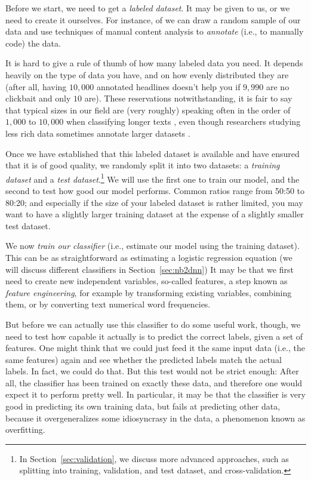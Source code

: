 Before we start, we need to get a \emph{labeled dataset}.
It may be given to us, or we need to create it ourselves.
For instance, of we can draw a random sample of our data and use techniques
of manual content analysis \citep[e.g.,][]{riffe2019analyzing} to
\emph{annotate} (i.e., to manually code) the data.

It is hard to give a rule of thumb of how many labeled data you need.
It depends heavily on the type of data you have, and on how evenly distributed
they are (after all, having $10,000$ annotated headlines doesn't help you if
$9,990$ are no clickbait and only $10$ are).
These reservations notwithstanding, it is fair to say that typical sizes in
our field are (very roughly) speaking often in the order of $1,000$ to $10,000$
when classifying longer texts \citep[see, for instance,][]{burscher2014teaching},
even though researchers studying less rich data sometimes annotate larger
datasets \citep[e.g., $60,000$ social media messages in][]{vermeer2019seeing}.

Once we have established that this labeled dataset is available and have
ensured that it is of good quality, we randomly split it into two datasets:
a \emph{training dataset} and a \emph{test dataset}.\footnote{In
  Section~\ref{sec:validation}, we discuss more advanced approaches, such
  as splitting into training, validation, and test dataset, and cross-validation.}
We will use the first one to train our model, and the second to test how
good our model performs. Common ratios range from 50:50 to 80:20; and especially
if the size of your labeled dataset is rather limited, you may want to have
a slightly larger training dataset at the expense of a slightly smaller test
dataset.

We now \emph{train our classifier} (i.e., estimate our model using the
training dataset). This can be as straightforward as estimating a logistic
regression equation (we will discuss different classifiers in
Section~\ref{sec:nb2dnn})
It may be that we first need to create new independent variables, so-called
features, a step known as \emph{feature engineering}, for example by transforming
existing variables, combining them, or by converting text numerical word frequencies.

But before we can actually use this classifier to do some useful work, though,
we need to test how capable it actually is to predict the correct labels,
given a set of features. One might think that we could just feed it the same
input data (i.e., the same features) again and see whether the predicted labels
match the actual labels.
In fact, we could do that.
But this test would not be strict enough:
After all, the classifier has been trained on exactly these data, and therefore
one would expect it to perform pretty well.
In particular, it may be that the classifier is very good in predicting its
own training data, but fails at predicting other data, because it overgeneralizes
some idiosyncrasy in the data, a phenomenon known as overfitting.

